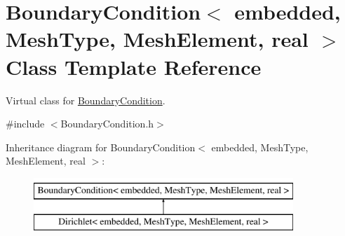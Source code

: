 \hypertarget{class_boundary_condition}{}\section{Boundary\+Condition$<$ embedded, Mesh\+Type, Mesh\+Element, real $>$ Class Template Reference}
\label{class_boundary_condition}


Virtual class for \hyperlink{class_boundary_condition}{Boundary\+Condition}.  




{\ttfamily \#include $<$Boundary\+Condition.\+h$>$}

Inheritance diagram for Boundary\+Condition$<$ embedded, Mesh\+Type, Mesh\+Element, real $>$\+:\begin{figure}[H]
\begin{center}
\leavevmode
\includegraphics[height=2.000000cm]{class_boundary_condition}
\end{center}
\end{figure}
